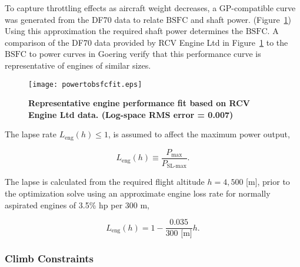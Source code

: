 To capture throttling effects as aircraft weight decreases, a GP-compatible curve was generated from the DF70 data to relate $\text{BSFC}$ and shaft power. (Figure~\ref{f:powertobsfc})
Using this approximation the required shaft power determines the $\text{BSFC}$.
A comparison of the DF70 data provided by RCV Engine Ltd in Figure~\ref{f:powertobsfc} to the $\text{BSFC}$ to power curves in Goering\cite{bsfcperf} verify that this performance curve is representative of engines of similar sizes. 



\begin{figure}[H]
	\begin{center}
	\texttt{[image: powertobsfcfit.eps]}
    \caption{\textbf{Representative engine performance fit based on RCV Engine Ltd data.  (Log-space RMS error = 0.007) }}
	\label{f:powertobsfc}
	\end{center}
\end{figure}

The lapse rate $L_{\text{eng}}(h) \leq 1$, is assumed to affect the maximum power output,

\begin{equation}
    \label{e:lapse}
    L_{\text{eng}}(h) \equiv \frac{P_{\text{max}}}{P_{\text{SL-max}}}.
\end{equation}

The lapse is calculated from the required flight altitude $h=4,500$ [m], prior to the optimization solve using an approximate engine loss rate for normally aspirated engines of 3.5\% hp per 300 m,\cite{enginelapse}

\begin{equation}
    \label{e:lapsefit}
    L_{\text{eng}}(h) = 1 - \frac{0.035}{300 \text{ [m]}} h.
\end{equation}

\subsubsection{Climb Constraints}

